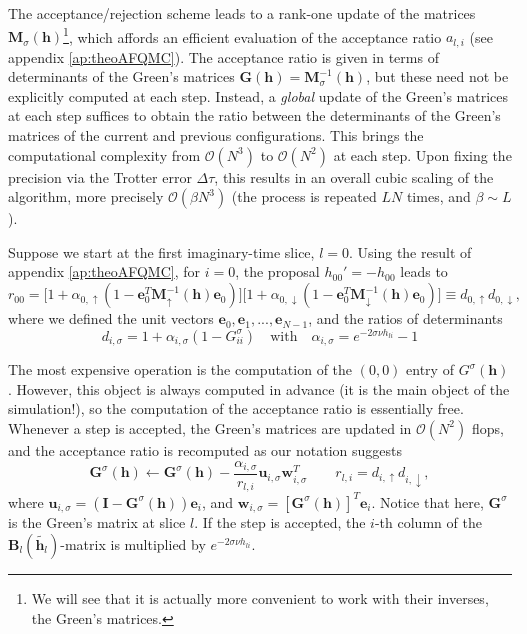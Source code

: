 The acceptance/rejection scheme leads to a rank-one update of the matrices $\bm M_\sigma (\bm h)$\footnote{We will see that it is actually more convenient to work with their inverses, the Green's matrices.}, which affords an efficient evaluation of the acceptance ratio $a_{l, i}$ \cite{hou_numerical_2009} (see appendix \ref{ap:theoAFQMC}).
The acceptance ratio is given in terms of determinants of the Green's matrices $\bm G (\bm h) = \bm M_\sigma^{-1} (\bm h)$, but these need not be explicitly computed at each step.
Instead, a \emph{global} update of the Green's matrices at each step suffices to obtain the ratio between the determinants of the Green's matrices of the current and previous configurations.
This brings the computational complexity from $\mathcal{O}(N^3)$ to $\mathcal{O}(N^2)$ at each step.
Upon fixing the precision via the Trotter error $\Delta \tau$, this results in an overall cubic scaling of the algorithm, more precisely $\mathcal{O}(\beta N^3)$ (the process is repeated $L N$ times, and $\beta \sim L$).

Suppose we start at the first imaginary-time slice, $l = 0$.
Using the result of appendix \ref{ap:theoAFQMC}, for $i = 0$, the proposal $h_{0 0}' = - h_{0 0}$ leads to
\begin{equation}
r_{0 0} = \bigg[ 1 + \alpha_{0, \uparrow} ( 1 - \bm e_0^T \bm M_\uparrow^{-1} ( \bm h ) \bm e_0 ) \bigg] \bigg[ 1 + \alpha_{0, \downarrow} ( 1 - \bm e_0^T \bm M_\downarrow^{-1} ( \bm h ) \bm e_0 ) \bigg] \equiv d_{0, \uparrow} d_{0, \downarrow} ,
\end{equation}
where we defined the unit vectors $\bm e_0, \bm e_1, ..., \bm e_{N-1}$, and the ratios of determinants
\begin{equation*}
d_{i, \sigma} = 1 + \alpha_{i, \sigma} ( 1 - G^\sigma_{i i} ) \quad \text{with} \quad \alpha_{i, \sigma} = e^{-2 \sigma \nu h_{l i}} - 1
\end{equation*}

The most expensive operation is the computation of the $(0, 0)$ entry of $G^\sigma (\bm h)$.
However, this object is always computed in advance (it is the main object of the simulation!), so the computation of the acceptance ratio is essentially free.
Whenever a step is accepted, the Green's matrices are updated in $\mathcal{O}(N^2)$ flops, and the acceptance ratio is recomputed as our notation suggests
\begin{equation}\label{eq:updates}
\bm G^\sigma ( \bm h ) \leftarrow \bm G^\sigma ( \bm h ) - \frac{\alpha_{i, \sigma}}{r_{l, i}} \bm u_{i, \sigma} \bm w_{i, \sigma}^T \quad \quad r_{l,i} = d_{i, \uparrow} d_{i, \downarrow} ,
\end{equation}
where $\bm u_{i, \sigma} = ( \bm I - \bm G^\sigma ( \bm h ) ) \bm e_i$, and $\bm w_{i, \sigma} = [ \bm G^\sigma (\bm h) ]^T \bm e_i$.
Notice that here, $\bm G^\sigma$ is the Green's matrix at slice $l$.
If the step is accepted, the $i$-th column of the $\bm B_l ( \widetilde{\bm h_l} )$-matrix is multiplied by $e^{-2 \sigma \nu h_{l i}}$.

